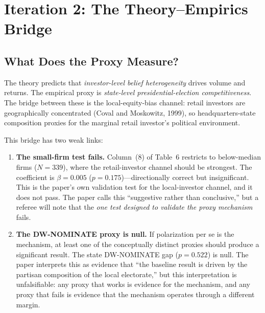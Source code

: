 \documentclass[11pt]{article}
\begin{document}
\section{Iteration 2: The Theory--Empirics Bridge}
\label{sec:bridge}

\subsection{What Does the Proxy Measure?}

The theory predicts that \emph{investor-level belief heterogeneity} drives volume and returns. The empirical proxy is \emph{state-level presidential-election competitiveness}. The bridge between these is the local-equity-bias channel: retail investors are geographically concentrated (Coval and Moskowitz, 1999), so headquarters-state composition proxies for the marginal retail investor's political environment.

This bridge has two weak links:

\begin{enumerate}[leftmargin=*]
    \item \textbf{The small-firm test fails.} Column~(8) of Table~6 restricts to below-median firms ($N = 339$), where the retail-investor channel should be strongest. The coefficient is $\beta = 0.005$ ($p = 0.175$)---directionally correct but insignificant. This is the paper's own validation test for the local-investor channel, and it does not pass. The paper calls this ``suggestive rather than conclusive,'' but a referee will note that the \emph{one test designed to validate the proxy mechanism} fails.

    \item \textbf{The DW-NOMINATE proxy is null.} If polarization per se is the mechanism, at least one of the conceptually distinct proxies should produce a significant result. The state DW-NOMINATE gap ($p = 0.522$) is null. The paper interprets this as evidence that ``the baseline result is driven by the partisan composition of the local electorate,'' but this interpretation is unfalsifiable: any proxy that works is evidence for the mechanism, and any proxy that fails is evidence that the mechanism operates through a different margin.
\end{enumerate}
\end{document}
